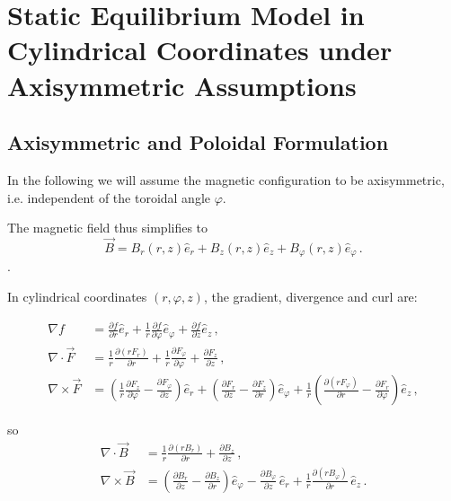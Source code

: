 \chapter{Static Equilibrium Model in Cylindrical Coordinates under Axisymmetric Assumptions}
\label{chap: Static equilibrium model in cylindrical coordinates under axisymmetric assumptions}

\section{Axisymmetric and Poloidal Formulation}
\label{sec: equlibrium Axisymmetric and poloidal formulation}


In the following we will assume the magnetic configuration to be axisymmetric, i.e. independent of the toroidal angle $\varphi$.

The magnetic field thus simplifies to
\begin{equation}
    \vec{B} = B_r (r,z) \hat{e}_r + B_z(r,z) \hat{e}_z + B_\varphi(r,z) \hat{e}_\varphi \, .
    \label{eq: axisymm. magn. field}
\end{equation}
.

In cylindrical coordinates $(r, \varphi, z)$, the gradient, divergence and curl are:

\begin{align*}
    \nabla  f &= \frac{\partial f}{\partial r} \hat{e}_r + \frac{1}{r}\frac{\partial f}{\partial \varphi} \hat{e}_\varphi + \frac{\partial f}{\partial z} \hat{e}_z  \, ,\\
    \nabla \cdot \vec{F} &= \frac{1}{r}\frac{\partial (r F_r)}{\partial r} + \frac{1}{r}\frac{\partial F_\varphi}{\partial \varphi} + \frac{\partial F_z}{\partial z}  \, ,\\
    \nabla \times \vec{F} &= \left(\frac{1}{r}\frac{\partial F_z}{\partial \varphi} - \frac{\partial F_\varphi}{\partial z}\right)\hat{e}_r
    + \left(\frac{\partial F_r}{\partial z} - \frac{\partial F_z}{\partial r}\right)\hat{e}_\varphi
    + \frac{1}{r}\left(\frac{\partial (r F_\varphi)}{\partial r} - \frac{\partial F_r}{\partial \varphi}\right)\hat{e}_z \, ,
\end{align*}

so
\begin{align}
    \nabla \cdot \vec{B}  &= \frac{1}{r}\frac{\partial (r B_r)}{\partial r} + \frac{\partial B_z}{\partial z} \, , \label{eq: axisymm. cylindrical div}\\
    \nabla \times \vec{B} &= 
\left(\frac{\partial B_r}{\partial z} - \frac{\partial B_z}{\partial r}\right)\hat{e}_\varphi 
- \frac{\partial B_\varphi}{\partial z}\,\hat{e}_r 
+ \frac{1}{r}\frac{\partial(r B_\varphi)}{\partial r}\,\hat{e}_z  \, .
    \label{eq: axisymm. cylindrical curl}
\end{align}

